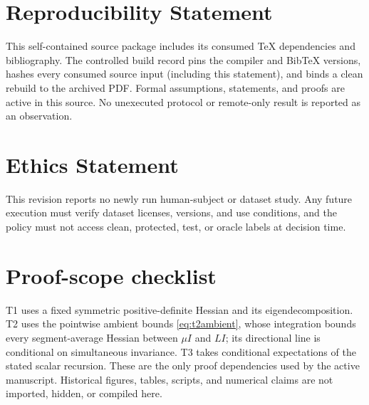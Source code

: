 \documentclass{article}
\begin{document}
\section*{Reproducibility Statement}

This self-contained source package includes its consumed TeX dependencies and
bibliography. The controlled build record pins the compiler and BibTeX
versions, hashes every consumed source input (including this statement), and
binds a clean rebuild to the archived PDF. Formal assumptions, statements, and
proofs are active in this source. No unexecuted protocol or remote-only result
is reported as an observation.

\section*{Ethics Statement}

This revision reports no newly run human-subject or dataset study. Any future
execution must verify dataset licenses, versions, and use conditions, and the
policy must not access clean, protected, test, or oracle labels at decision
time.






\appendix
\section{Proof-scope checklist}

T1 uses a fixed symmetric positive-definite Hessian and its eigendecomposition.
T2 uses the pointwise ambient bounds \eqref{eq:t2ambient}, whose integration
bounds every segment-average Hessian between $\mu I$ and $LI$; its directional
line is conditional on simultaneous invariance. T3 takes conditional
expectations of the stated scalar recursion. These are the only proof
dependencies used by the active manuscript. Historical figures, tables,
scripts, and numerical claims are not imported, hidden, or compiled here.
\end{document}
